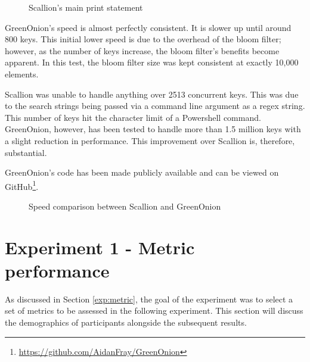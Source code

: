 \begin{figure}[h!]
    
    \caption{Scallion's main print statement}
    \label{fig:scallionCode}
\end{figure}

GreenOnion's speed is almost perfectly consistent. It is slower up until  around 800 keys. This initial lower speed is due to the overhead of the bloom filter; however, as the number of keys increase, the bloom filter's benefits become apparent. In this test, the bloom filter size was kept consistent at exactly 10,000 elements. 

Scallion was unable to handle anything over 2513 concurrent keys. This was due to the search strings being passed via a command line argument as a regex string. This number of keys hit the character limit of a Powershell command. GreenOnion, however, has been tested to handle more than 1.5 million keys with a slight reduction in performance. This improvement over Scallion is, therefore, substantial.

GreenOnion's code has been made publicly available and can be viewed on GitHub\footnote{\url{https://github.com/AidanFray/GreenOnion}}.

\begin{figure}[h!]
    \centering
    
    \label{tab:scallion_speed}
    \caption{Speed comparison between Scallion and GreenOnion}
\end{figure}

\newpage

\section{Experiment 1 - Metric performance}

As discussed in Section \ref{exp:metric}, the goal of the experiment was to select a set of metrics to be assessed in the following experiment. This section will discuss the demographics of participants alongside the subsequent results.

